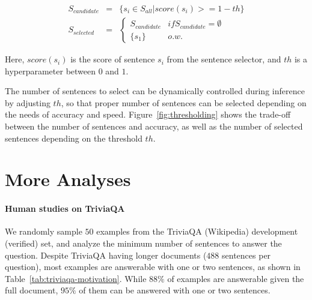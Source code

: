 \documentclass[11pt,a4paper]{article}
\newcommand{\full}{\textsc{Full}}
\newcommand{\ours}{\textsc{Minimal}}
\newcommand{\venndiagram}{Venn diagram}
\begin{document}
\vspace{-.5cm}
\begin{eqnarray}
  S_{candidate} &=& \{s_i \in S_{all} | score(s_i) >= 1-th\} \\
  S_{selected} &=&
  \begin{cases}
  	S_{candidate} & if S_{candidate} = \emptyset \\
    \{s_1\} & o.w.
  \end{cases}
\end{eqnarray}

Here, $score(s_i)$ is the score of sentence $s_i$ from the sentence selector, and $th$ is a hyperparameter between $0$ and $1$.

The number of sentences to select can be dynamically controlled during inference by adjusting $th$, so that proper number of sentences can be selected depending on the needs of accuracy and speed.
Figure~\ref{fig:thresholding} shows the trade-off between the number of sentences and accuracy, as well as the number of selected sentences depending on the threshold $th$.










 \section{More Analyses}\label{sec:app-analysis}\paragraph{Human studies on TriviaQA}
We randomly sample $50$ examples from the TriviaQA (Wikipedia) development (verified) set, and analyze the minimum number of sentences to answer the question.
Despite TriviaQA having longer documents ($488$ sentences per question), most examples are answerable with one or two sentences, as shown in Table~\ref{tab:triviaqa-motivation}.
While $88\%$ of examples are answerable given the full document, $95\%$ of them can be answered with one or two sentences.

\begin{figure*}[pht]
\centering
{}
\caption{
(Left) \venndiagram of the questions answered correctly by \full~and with \ours. (Middle and Right) Error cases from \full~(Middle) and \ours~(Right), broken down by which sentence the model's prediction comes from.
}
\label{fig:squad-error-analysis}
\end{figure*}
\end{document}
